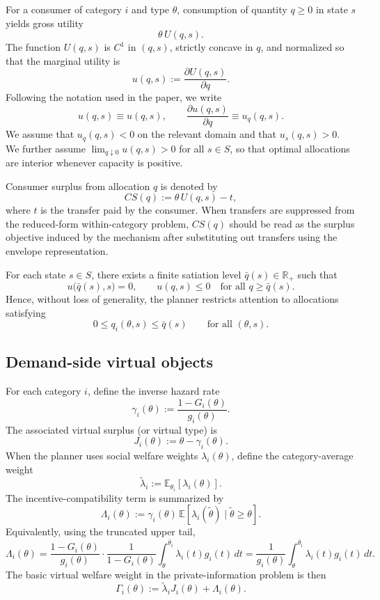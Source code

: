 \documentclass[master.tex]{subfiles}
\begin{document}
For a consumer of category $i$ and type $\theta$, consumption of quantity $q \ge 0$ in state $s$ yields gross utility
\[
\theta \, U(q,s).
\]
The function $U(q,s)$ is $C^1$ in $(q,s)$, strictly concave in $q$, and normalized so that the marginal utility is
\[
u(q,s) := \frac{\partial U(q,s)}{\partial q}.
\]
Following the notation used in the paper, we write
\[
u(q,s) \equiv u(q,s), \qquad \frac{\partial u(q,s)}{\partial q} \equiv u_q(q,s).
\]
We assume that $u_q(q,s)<0$ on the relevant domain and that $u_s(q,s)>0$. We further assume $\lim_{q\downarrow 0}u(q,s)>0$ for all $s\in S$, so that optimal allocations are interior whenever capacity is positive.

Consumer surplus from allocation $q$ is denoted by
\[
CS(q) := \theta \, U(q,s) - t,
\]
where $t$ is the transfer paid by the consumer. When transfers are suppressed from the reduced-form within-category problem, $CS(q)$ should be read as the surplus objective induced by the mechanism after substituting out transfers using the envelope representation.

\begin{assumption}\label{ass:satiation}
For each state $s\in S$, there exists a finite satiation level $\bar q(s)\in \mathbb R_+$ such that
\[
u\bigl(\bar q(s),s\bigr)=0, \qquad u(q,s)\le 0 \quad \text{for all } q\ge \bar q(s).
\]
Hence, without loss of generality, the planner restricts attention to allocations satisfying
\[
0\le q_i(\theta,s)\le \bar q(s) \qquad \text{for all } (\theta,s).
\]
\end{assumption}

\subsection{Demand-side virtual objects}

For each category $i$, define the inverse hazard rate
\[
\gamma_i(\theta) := \frac{1-G_i(\theta)}{g_i(\theta)}.
\]
The associated virtual surplus (or virtual type) is
\[
J_i(\theta) := \theta - \gamma_i(\theta).
\]
When the planner uses social welfare weights $\lambda_i(\theta)$, define the category-average weight
\[
\tilde \lambda_i := \mathbb E_{\theta_i}[\lambda_i(\theta)].
\]
The incentive-compatibility term is summarized by
\[
\Lambda_i(\theta) := \gamma_i(\theta)\, \mathbb E\!\left[\lambda_i(\tilde \theta) \mid \tilde \theta \ge \theta \right].
\]
Equivalently, using the truncated upper tail,
\[
\Lambda_i(\theta) = \frac{1-G_i(\theta)}{g_i(\theta)} \cdot \frac{1}{1-G_i(\theta)} \int_\theta^{\overline \theta_i} \lambda_i(t) g_i(t) \, dt = \frac{1}{g_i(\theta)} \int_\theta^{\overline \theta_i} \lambda_i(t) g_i(t) \, dt.
\]
The basic virtual welfare weight in the private-information problem is then
\[
\Gamma_i(\theta) := \tilde \lambda_i J_i(\theta) + \Lambda_i(\theta).
\]
\end{document}
